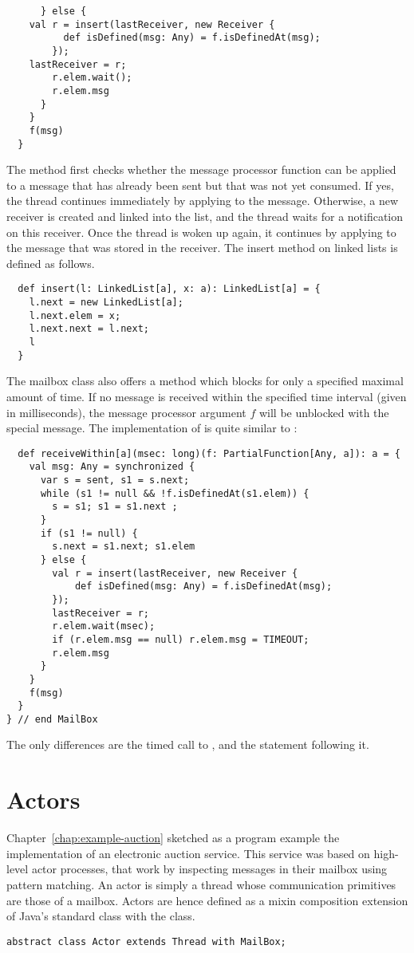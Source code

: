 {\begin{lstlisting}
      } else {
	val r = insert(lastReceiver, new Receiver {
          def isDefined(msg: Any) = f.isDefinedAt(msg);
        });
	lastReceiver = r;
        r.elem.wait();
        r.elem.msg
      }
    }
    f(msg)
  }
\end{lstlisting}
The  method first checks whether the message processor function
 can be applied to a message that has already been sent but that
was not yet consumed. If yes, the thread continues immediately by
applying  to the message. Otherwise, a new receiver is created
and linked into the  list, and the thread waits for a
notification on this receiver. Once the thread is woken up again, it
continues by applying  to the message that was stored in the
receiver. The insert method on linked lists is defined as follows.
\begin{lstlisting}
  def insert(l: LinkedList[a], x: a): LinkedList[a] = {
    l.next = new LinkedList[a];
    l.next.elem = x;
    l.next.next = l.next;
    l
  }
\end{lstlisting}
The mailbox class also offers a method 
which blocks for only a specified maximal amount of time.  If no
message is received within the specified time interval (given in
milliseconds), the message processor argument $f$ will be unblocked
with the special  message.  The implementation of
 is quite similar to :
\begin{lstlisting}
  def receiveWithin[a](msec: long)(f: PartialFunction[Any, a]): a = {
    val msg: Any = synchronized {
      var s = sent, s1 = s.next;
      while (s1 != null && !f.isDefinedAt(s1.elem)) {
        s = s1; s1 = s1.next ;
      }
      if (s1 != null) {
        s.next = s1.next; s1.elem
      } else {
        val r = insert(lastReceiver, new Receiver {
            def isDefined(msg: Any) = f.isDefinedAt(msg);
        });
        lastReceiver = r;
        r.elem.wait(msec);
        if (r.elem.msg == null) r.elem.msg = TIMEOUT;
        r.elem.msg
      }
    }
    f(msg)
  }
} // end MailBox
\end{lstlisting}
The only differences are the timed call to , and the
statement following it.

\section{Actors}
\label{sec:actors}

Chapter~\ref{chap:example-auction} sketched as a program example the
implementation of an electronic auction service. This service was
based on high-level actor processes, that work by inspecting messages
in their mailbox using pattern matching. An actor is simply a thread
whose communication primitives are those of a mailbox.  Actors are
hence defined as a mixin composition extension of Java's standard
 class with the  class.
\begin{lstlisting}
abstract class Actor extends Thread with MailBox;
\end{lstlisting}

}
